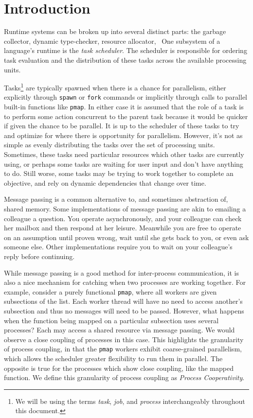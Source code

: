 \chapter{Introduction}
%
\label{chap:introduction}

Runtime systems can be broken up into several distinct parts: the garbage 
collector, dynamic type-checker, resource allocator, \etc~One 
subsystem of a language's runtime is the {\em task scheduler}. The scheduler is 
responsible for ordering task evaluation and the distribution of 
these tasks across the available processing units.

Tasks\footnote{We will be using the terms {\em task}, {\em job}, and {\em process} interchangeably throughout this document.}
are typically spawned when there is a chance for parallelism, either 
explicitly through \texttt{spawn} or \texttt{fork} commands or implicitly 
through calls to parallel built-in functions like \texttt{pmap}. In either 
case it is assumed that the role of a task is to perform some action concurrent 
to the parent task because it would be quicker if given the chance to be 
parallel.
It is up to the scheduler of these tasks to try and optimize for where there
is opportunity for parallelism. However, it's not as simple as evenly 
distributing the tasks over the set of processing units. Sometimes, these 
tasks need particular resources which other tasks are currently using,
or perhaps some tasks are waiting for user input and don't have anything to
do. Still worse, some tasks may be trying to work together to complete an 
objective, and rely on dynamic dependencies that change over time.

Message passing is a common alternative to, and sometimes abstraction of, shared
memory. Some implementations of message passing are akin to emailing a colleague a question. You operate
asynchronously, and your colleague can check her mailbox and then
respond at her leisure. Meanwhile you are free to operate on an assumption 
until proven wrong, wait until she gets back to you, or even ask someone else.
Other implementations require you to wait on your colleague's reply before
continuing.

While message passing is a good method for inter-process communication, it is
also a nice mechanism for catching when two processes are working together.
For example, consider a purely functional \texttt{pmap}, where all 
workers are given subsections of the list. Each worker thread will have no
need to access another's subsection and thus no messages will need to be passed.
However, what happens when the function being mapped on a particular subsection uses 
several processes? Each may access a shared resource via message passing. 
We would observe a close coupling of processes in this case.
This highlights the granularity of process coupling, in that the \texttt{pmap}
workers exhibit coarse-grained parallelism, which allows the scheduler greater 
flexibility to run them in parallel. The opposite is true for the processes 
which show close coupling, like the mapped function. We define this granularity of process
coupling as {\em Process Cooperativity}.


